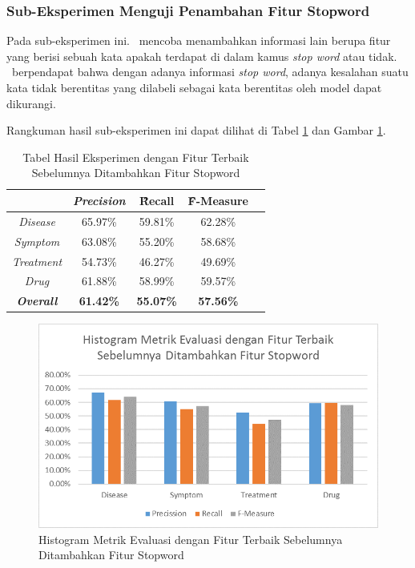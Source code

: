 	\subsubsection{Sub-Eksperimen Menguji Penambahan Fitur Stopword}\label{eks:subekstopword}
	Pada sub-eksperimen ini. \saya~mencoba menambahkan informasi lain berupa fitur yang berisi sebuah kata apakah terdapat di dalam kamus \textit{stop word} atau tidak. \Saya~berpendapat bahwa dengan adanya informasi \textit{stop word}, adanya kesalahan suatu kata tidak berentitas yang dilabeli sebagai kata berentitas oleh model dapat dikurangi.
	
	Rangkuman hasil sub-eksperimen ini dapat dilihat di Tabel \ref{table:owndict3} dan Gambar \ref{fig:owndict3}.
	
	\begin{table}
		\centering
		\caption{Tabel Hasil Eksperimen dengan Fitur Terbaik Sebelumnya Ditambahkan Fitur Stopword}
		\begin{tabular}{|c|c|c|c|c|}
			\hline
							      & \textit{Precision} & \f{\f{Recall}} & \f{\f{F-Measure}} \\ \hline
			\textit{Disease}      & 65.97\%             & 59.81\%        & 62.28\%           \\ \hline
			\textit{Symptom}      & 63.08\%             & 55.20\%        & 58.68\%           \\ \hline
			\textit{Treatment}    & 54.73\%             & 46.27\%        & 49.69\%           \\ \hline
			\textit{Drug}		  & 61.88\%             & 58.99\%        & 59.57\%           \\ \hline
			\textit{\textbf{Overall}}&\textbf{61.42\%}  & \textbf{55.07\%}& \textbf{57.56\%} \\ \hline
		\end{tabular}
		\label{table:owndict3}
	\end{table}
		
	\begin{figure}
		\centering
		\includegraphics[width=0.85\linewidth]{images/histogram3}
		\caption{Histogram Metrik Evaluasi dengan Fitur Terbaik Sebelumnya Ditambahkan Fitur Stopword}
		\label{fig:owndict3}
	\end{figure}
	
